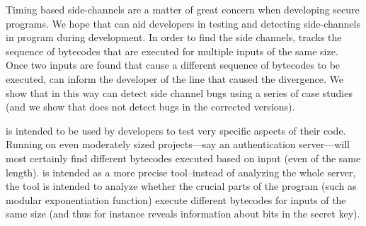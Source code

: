 Timing based side-channels are a matter of great concern when developing 
secure programs.
We hope that \jcupid can aid developers in testing and detecting side-channels
in program during development. 
In order to find the side channels, \jcupid  tracks the sequence of bytecodes
that are executed for multiple inputs of the same size.
Once two inputs are found that cause a different sequence of bytecodes to be
executed, \jcupid can inform the developer of the line that caused the
divergence.
We show that in this way \jcupid can detect side channel bugs using a series of
case studies (and we show that \jcupid does not detect bugs in the corrected
versions). 
 
\jcupid is intended to be used by developers to test very specific aspects of
their code.
Running \jcupid on even moderately sized  projects---say an authentication
server---will most certainly find different bytecodes executed based on input
(even of the same length).
\jcupid is intended as a more precise tool--instead of analyzing the whole
server, the tool is intended to analyze whether the crucial parts of the program
(such as modular exponentiation function) execute different bytecodes for inputs
of the same size (and thus for instance reveals information about bits in the
secret key).  

